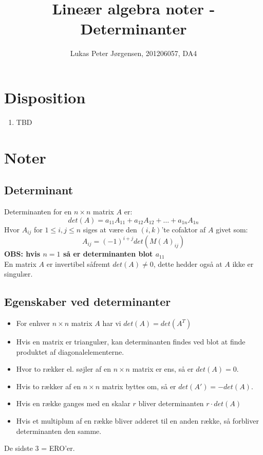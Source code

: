 \documentclass[a4paper,oneside,article]{memoir}
\begin{document}
    \title{Lineær algebra noter - Determinanter}
    \author{Lukas Peter Jørgensen, 201206057, DA4
            }
    \maketitle
    
    \tableofcontents
        
    \chapter{Disposition}
    \begin{enumerate}
    	\item TBD
    \end{enumerate}
    
	\chapter{Noter}
	
	\section{Determinant}
	Determinanten for en $n \times n$ matrix $A$
	er:
	$$det(A)=a_{11}A_{11}+a_{12}A_{12}+ \dots + a_{1n}A_{1n}$$
	Hvor $A_{ij}$ for $1\leq i, j\leq n$ siges at være den $(i,k)$'te
	cofaktor af $A$ givet som:
	$$A_{ij}=(-1)^{i+j}det(M(A)_{ij})$$
	\textbf{OBS: hvis $n=1$ så er determinanten blot $a_{11}$}\\
	En matrix $A$ er invertibel såfremt $det(A)\neq 0$, dette hedder også at $A$ ikke er singulær.
	
	\section{Egenskaber ved determinanter}
	\begin{itemize}
	\item For enhver $n\times n$ matrix $A$ har vi $det(A)=det(A^T)$
	\item Hvis en matrix er triangulær, kan determinanten findes ved 
	blot at finde produktet af diagonalelementerne.
	\item Hvor to rækker el. søjler af en $n \times n$ matrix er ens,
	så er $det(A)=0$.
	\item Hvis to rækker af en $n \times n$ matrix byttes om, så er
	$det(A')=-det(A)$.
	\item Hvis en række ganges med en skalar $r$ bliver determinanten
	$r\cdot det(A)$
	\item Hvis et multiplum af en række bliver adderet til en anden 
	række, så forbliver determinanten den samme.
	\end{itemize}
	De sidste 3 = ERO'er.
	
\end{document}
